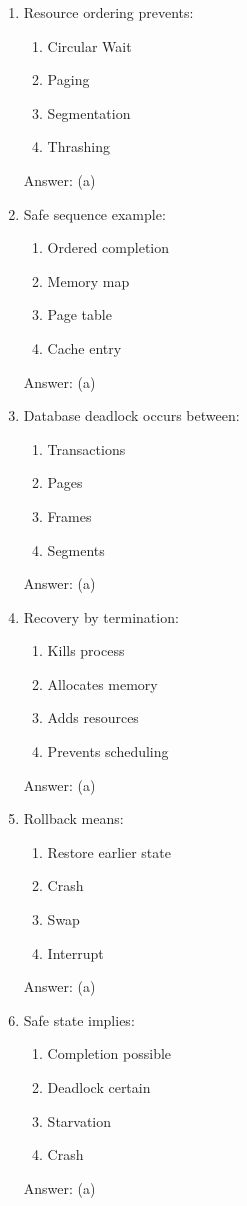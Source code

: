 \begin{enumerate}
\item Resource ordering prevents:
\begin{enumerate}[label=(\alph*)]
\item Circular Wait
\item Paging
\item Segmentation
\item Thrashing
\end{enumerate}
Answer: (a)

\item Safe sequence example:
\begin{enumerate}[label=(\alph*)]
\item Ordered completion
\item Memory map
\item Page table
\item Cache entry
\end{enumerate}
Answer: (a)

\item Database deadlock occurs between:
\begin{enumerate}[label=(\alph*)]
\item Transactions
\item Pages
\item Frames
\item Segments
\end{enumerate}
Answer: (a)

\item Recovery by termination:
\begin{enumerate}[label=(\alph*)]
\item Kills process
\item Allocates memory
\item Adds resources
\item Prevents scheduling
\end{enumerate}
Answer: (a)

\item Rollback means:
\begin{enumerate}[label=(\alph*)]
\item Restore earlier state
\item Crash
\item Swap
\item Interrupt
\end{enumerate}
Answer: (a)

\item Safe state implies:
\begin{enumerate}[label=(\alph*)]
\item Completion possible
\item Deadlock certain
\item Starvation
\item Crash
\end{enumerate}
Answer: (a)


\end{enumerate}
